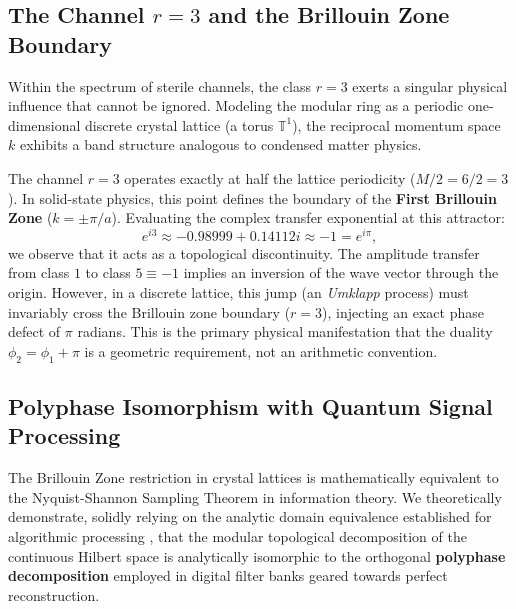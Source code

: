 \documentclass[reprint,aps,pra,superscriptaddress,nofootinbib]{revtex4-2}
\theoremstyle{plain}
\theoremstyle{definition}
\theoremstyle{remark}
\begin{document}
\subsection{The Channel $r=3$ and the Brillouin Zone Boundary}

Within the spectrum of sterile channels, the class $r=3$ exerts a singular physical influence that cannot be ignored. Modeling the modular ring as a periodic one-dimensional discrete crystal lattice (a torus $\mathbb{T}^1$), the reciprocal momentum space $k$ exhibits a band structure analogous to condensed matter physics.

The channel $r=3$ operates exactly at half the lattice periodicity ($M/2 = 6/2 = 3$). In solid-state physics, this point defines the boundary of the \textbf{First Brillouin Zone} ($k = \pm \pi/a$). Evaluating the complex transfer exponential at this attractor:
\begin{equation}
e^{i3} \approx -0.98999 + 0.14112i \approx -1 = e^{i\pi},
\end{equation}
we observe that it acts as a topological discontinuity. The amplitude transfer from class $1$ to class $5 \equiv -1$ implies an inversion of the wave vector through the origin. However, in a discrete lattice, this jump (an \textit{Umklapp} process) must invariably cross the Brillouin zone boundary ($r=3$), injecting an exact phase defect of $\pi$ radians. This is the primary physical manifestation that the duality $\phi_2 = \phi_1 + \pi$ is a geometric requirement, not an arithmetic convention.

\subsection{Polyphase Isomorphism with Quantum Signal Processing}

The Brillouin Zone restriction in crystal lattices is mathematically equivalent to the Nyquist-Shannon Sampling Theorem in information theory. We theoretically demonstrate, solidly relying on the analytic domain equivalence established for algorithmic processing \cite{Peinador_Isomorfismo_DSP_2025}, that the modular topological decomposition of the continuous Hilbert space is analytically isomorphic to the orthogonal \textbf{polyphase decomposition} employed in digital filter banks geared towards perfect reconstruction.
\end{document}
